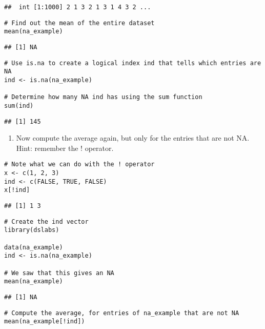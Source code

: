 \documentclass[
]{article}
\providecommand{\tightlist}{%
  \setlength{\itemsep}{0pt}\setlength{\parskip}{0pt}}
\begin{document}
\begin{verbatim}
##  int [1:1000] 2 1 3 2 1 3 1 4 3 2 ...
\end{verbatim}

\begin{verbatim}
# Find out the mean of the entire dataset 
mean(na_example)
\end{verbatim}

\begin{verbatim}
## [1] NA
\end{verbatim}

\begin{verbatim}
# Use is.na to create a logical index ind that tells which entries are NA
ind <- is.na(na_example)

# Determine how many NA ind has using the sum function
sum(ind)
\end{verbatim}

\begin{verbatim}
## [1] 145
\end{verbatim}

\begin{enumerate}
\def\labelenumi{\arabic{enumi}.}
\setcounter{enumi}{7}
\tightlist
\item
  Now compute the average again, but only for the entries that are not
  NA. Hint: remember the ! operator.
\end{enumerate}

\begin{verbatim}
# Note what we can do with the ! operator
x <- c(1, 2, 3)
ind <- c(FALSE, TRUE, FALSE)
x[!ind]
\end{verbatim}

\begin{verbatim}
## [1] 1 3
\end{verbatim}

\begin{verbatim}
# Create the ind vector
library(dslabs)

data(na_example)
ind <- is.na(na_example)

# We saw that this gives an NA
mean(na_example)
\end{verbatim}

\begin{verbatim}
## [1] NA
\end{verbatim}

\begin{verbatim}
# Compute the average, for entries of na_example that are not NA 
mean(na_example[!ind])
\end{verbatim}
\end{document}
